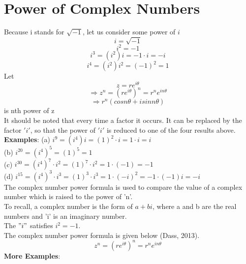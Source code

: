 \documentclass[a4paper, 12pt]{report}
\begin{document}
{\section{Power of Complex Numbers}
Because i stands for $\sqrt{-1}$, let us consider some power of $i$
\begin{equation*}
i = \sqrt{-1}
\end{equation*}
\begin{equation*}
i^2 = -1
\end{equation*}
\begin{equation*}
i^3 = (i^2)i = -1 \cdot i = -i
\end{equation*}
\begin{equation*}
i^4 = (i^2)i^2 = (-1)^2 = 1
\end{equation*}
Let
\begin{equation*}
z = re^{i\theta}
\end{equation*}
\begin{equation*}
\Rightarrow z^n = (re^{i\theta})^n = r^ne^{in\theta}
\end{equation*}
\begin{equation*}
\Rightarrow r^n(cosn\theta + isinn\theta)
\end{equation*}
is nth power of z\\
It should be noted that every time a factor it occurs. It can be replaced by the factor $'i'$, so that the power of $'i'$ is reduced to one of the four results above.\\
\textbf{Examples}:
(a) $i^9 = (i^4)i = (1)^2\cdot i = 1\cdot i = i$\\
(b) $i^{20} = (i^4)^5 = (1)^5 = 1$\\
(c) $i^{30} = (i^4)^7\cdot i^2 = (1)^7\cdot i^2 = 1\cdot (-1) = -1$\\
(d) $i^{15} = (i^4)^3\cdot i^3 = (1)^3\cdot i^3 = 1\cdot (-i)^2 = -1\cdot (-1)i = -i$\\
The complex number power formula is used to compare the value of a complex number which is raised to the power of 'n'.\\
To recall, a complex number is the form of $a + bi$, where a and b are the real numbers and 'i' is an imaginary number.\\The $"i"$ satisfies $i^2 = -1$.\\
The complex number power formula is given below (Dass, 2013).
\begin{equation*}
z^n = (re^{i\theta})^n = r^ne^{in\theta}
\end{equation*}
\textbf{More Examples}:\\
}
\end{document}
